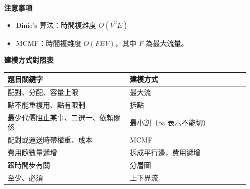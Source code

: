 {\large\bfseries 注意事項\par}
\medskip
\begin{itemize}
  \item Dinic's 算法：時間複雜度 $O(V^2E)$
  \item MCMF：時間複雜度 $O(FEV)$，其中 $F$ 為最大流量。
\end{itemize}

{\large\bfseries 建模方式對照表\par}
\medskip
\noindent
\begin{tabular}{@{}p{0.48\linewidth}p{0.47\linewidth}@{}}
  \hline
  \textbf{題目關鍵字} & \textbf{建模方式} \\
  \hline
  配對、分配、容量上限 & 最大流 \\
  點不能重複用、點有限制 & 拆點 \\
  最少代價阻止某事、二選一、依賴關係 & 最小割（$\infty$ 表示不能切） \\
  配對或運送時帶權重、成本 & MCMF \\
  費用隨數量遞增 & 拆成平行邊，費用遞增 \\
  跟時間步有關 & 分層圖 \\
  至少、必須 & 上下界流 \\
  \hline
\end{tabular}

\setlength{\parindent}{0em}